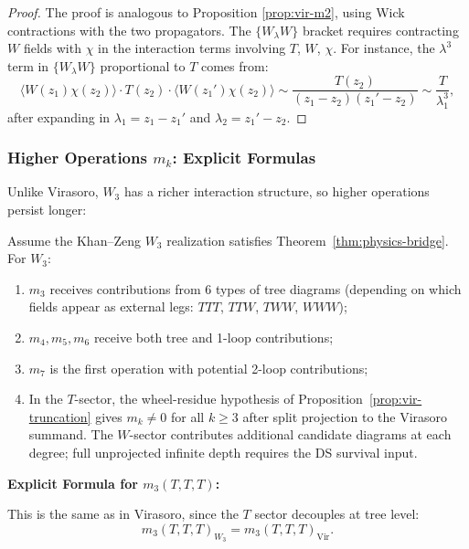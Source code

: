 \begin{proof}
The proof is analogous to Proposition \ref{prop:vir-m2}, using Wick contractions with the two propagators. The $\{W_\lambda W\}$ bracket requires contracting $W$ fields with $\chi$ in the interaction terms involving $T$, $W$, $\chi$. For instance, the $\lambda^3$ term in $\{W_\lambda W\}$ proportional to $T$ comes from:
\[
\langle W(z_1) \chi(z_2) \rangle \cdot T(z_2) \cdot \langle W(z_1') \chi(z_2) \rangle \sim \frac{T(z_2)}{(z_1-z_2)(z_1'-z_2)} \sim \frac{T}{\lambda_1^3},
\]
after expanding in $\lambda_1 = z_1 - z_1'$ and $\lambda_2 = z_1' - z_2$.
\end{proof}

\subsubsection{Higher Operations $m_k$: Explicit Formulas}

Unlike Virasoro, $W_3$ has a richer interaction structure, so higher operations persist longer:

\begin{proposition}
Assume the Khan--Zeng $W_3$ realization satisfies
Theorem~\ref{thm:physics-bridge}.
For $W_3$:
\begin{enumerate}
\item $m_3$ receives contributions from 6 types of tree diagrams (depending on which fields appear as external legs: $TTT$, $TTW$, $TWW$, $WWW$);
\item $m_4, m_5, m_6$ receive both tree and 1-loop contributions;
\item $m_7$ is the first operation with potential 2-loop contributions;
\item In the $T$-sector, the wheel-residue hypothesis of
Proposition~\ref{prop:vir-truncation} gives
$m_k \neq 0$ for all $k \geq 3$ after split projection to the
Virasoro summand. The $W$-sector contributes additional candidate
diagrams at each degree; full unprojected infinite depth requires the
DS survival input.
\end{enumerate}
\end{proposition}

\textbf{Explicit Formula for $m_3(T,T,T)$:}

This is the same as in Virasoro, since the $T$ sector decouples at tree level:
\begin{equation}
m_3(T,T,T)_{W_3} = m_3(T,T,T)_{\text{Vir}}.
\end{equation}

